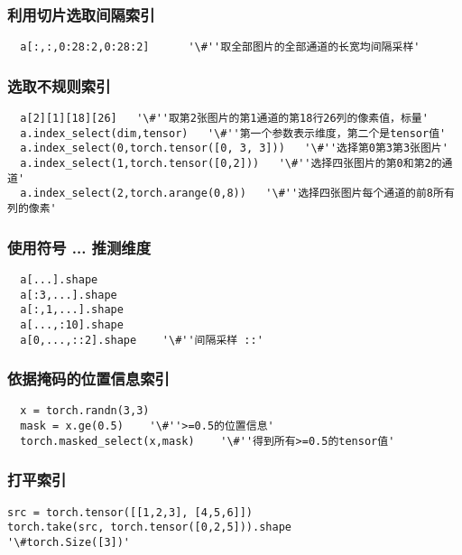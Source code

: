 \subsubsection{利用切片选取间隔索引}
\begin{lstlisting}
  a[:,:,0:28:2,0:28:2]      '\#''取全部图片的全部通道的长宽均间隔采样'
\end{lstlisting}

\subsubsection{选取不规则索引}
\begin{lstlisting}
  a[2][1][18][26]   '\#''取第2张图片的第1通道的第18行26列的像素值，标量'
  a.index_select(dim,tensor)   '\#''第一个参数表示维度，第二个是tensor值'
  a.index_select(0,torch.tensor([0, 3, 3]))   '\#''选择第0第3第3张图片'
  a.index_select(1,torch.tensor([0,2]))   '\#''选择四张图片的第0和第2的通道'
  a.index_select(2,torch.arange(0,8))   '\#''选择四张图片每个通道的前8所有列的像素'
\end{lstlisting}

\subsubsection{使用符号 ... 推测维度}
\begin{lstlisting}
  a[...].shape
  a[:3,...].shape
  a[:,1,...].shape
  a[...,:10].shape
  a[0,...,::2].shape    '\#''间隔采样 ::'
\end{lstlisting}

\subsubsection{依据掩码的位置信息索引}
\begin{lstlisting}
  x = torch.randn(3,3)
  mask = x.ge(0.5)    '\#''>=0.5的位置信息'
  torch.masked_select(x,mask)    '\#''得到所有>=0.5的tensor值'
\end{lstlisting}

\subsubsection{打平索引}
\begin{lstlisting}
src = torch.tensor([[1,2,3], [4,5,6]])
torch.take(src, torch.tensor([0,2,5])).shape          '\#torch.Size([3])'
\end{lstlisting}
~\\
~\\
~\\
~\\

